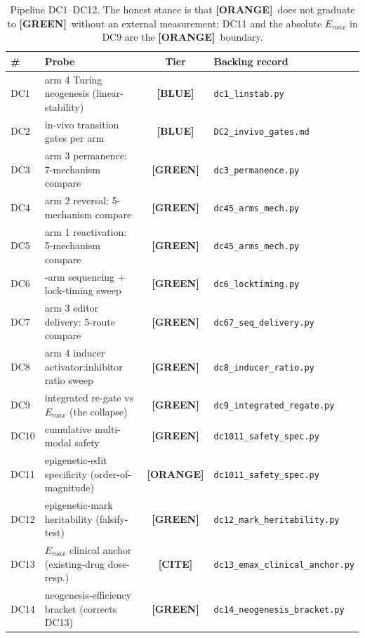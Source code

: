 \documentclass[11pt,a4paper]{article}
\newcommand{\tierbadge}[2]{\textcolor{#1}{\textbf{[#2]}}}
\providecommand{\tierBlue}{\tierbadge{blue!60!black}{BLUE}}
\providecommand{\tierGreen}{\tierbadge{green!45!black}{GREEN}}
\providecommand{\tierYellow}{\tierbadge{yellow!50!black}{CITE}}
\providecommand{\tierOrange}{\tierbadge{orange!80!black}{ORANGE}}
\begin{document}
\medskip
\begin{table}[h]
\centering
\small
\begin{tabular}{@{}>{\centering\arraybackslash}m{0.5cm} >{\raggedright\arraybackslash}m{6.4cm} c >{\raggedright\arraybackslash}m{4.4cm}@{}}
\toprule
\textbf{\#} & \textbf{Probe} & \textbf{Tier} & \textbf{Backing record} \\
\midrule
DC1  & arm 4 Turing neogenesis (linear-stability)        & \tierBlue  & \texttt{dc1\_linstab.py} \\
DC2  & in-vivo transition gates per arm                  & \tierBlue  & \texttt{DC2\_invivo\_gates.md} \\
DC3  & arm 3 permanence: 7-mechanism compare             & \tierGreen & \texttt{dc3\_permanence.py} \\
DC4  & arm 2 reversal: 5-mechanism compare               & \tierGreen & \texttt{dc45\_arms\_mech.py} \\
DC5  & arm 1 reactivation: 5-mechanism compare           & \tierGreen & \texttt{dc45\_arms\_mech.py} \\
DC6  & 4-arm sequencing + lock-timing sweep              & \tierGreen & \texttt{dc6\_locktiming.py} \\
DC7  & arm 3 editor delivery: 5-route compare            & \tierGreen & \texttt{dc67\_seq\_delivery.py} \\
DC8  & arm 4 inducer activator:inhibitor ratio sweep     & \tierGreen & \texttt{dc8\_inducer\_ratio.py} \\
DC9  & integrated re-gate vs $E_{max}$ (the collapse)    & \tierGreen & \texttt{dc9\_integrated\_regate.py} \\
DC10 & cumulative multi-modal safety                     & \tierGreen & \texttt{dc1011\_safety\_spec.py} \\
DC11 & epigenetic-edit specificity (order-of-magnitude)  & \tierOrange& \texttt{dc1011\_safety\_spec.py} \\
DC12 & epigenetic-mark heritability (falsify-test)       & \tierGreen & \texttt{dc12\_mark\_heritability.py} \\
DC13 & $E_{max}$ clinical anchor (existing-drug dose-resp.)& \tierYellow& \texttt{dc13\_emax\_clinical\_anchor.py} \\
DC14 & neogenesis-efficiency bracket (corrects DC13)      & \tierGreen & \texttt{dc14\_neogenesis\_bracket.py} \\
\bottomrule
\end{tabular}
\caption{Pipeline DC1--DC12. The honest stance is that \tierOrange\ does not
graduate to \tierGreen\ without an external measurement; DC11 and the absolute
$E_{max}$ in DC9 are the \tierOrange\ boundary.}
\label{tab:pipeline}
\end{table}
\end{document}
